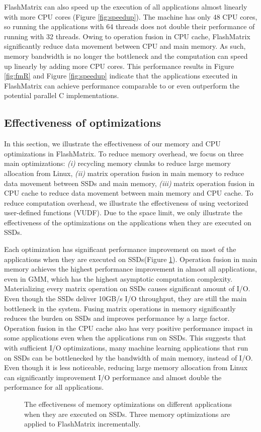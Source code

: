 FlashMatrix can also speed up the execution of all applications almost linearly
with more CPU cores (Figure \ref{fig:speedup}). The machine has only 48 CPU
cores, so running the applications with 64 threads does not double their
performance of running with 32 threads. Owing to operation fusion in CPU cache,
FlashMatrix significantly
reduce data movement between CPU and main memory. As such, memory bandwidth is
no longer the bottleneck and the computation can speed up linearly by adding
more CPU cores. This performance results in Figure \ref{fig:fmR} and Figure
\ref{fig:speedup} indicate that the applications executed in FlashMatrix can
achieve performance comparable to or even outperform the potential parallel
C implementations.

\subsection{Effectiveness of optimizations}

In this section, we illustrate the effectiveness of our memory and CPU
optimizations in FlashMatrix. To reduce memory overhead, we focus on three
main optimizations: \textit{(i)} recycling memory chunks to reduce large
memory allocation from Linux, \textit{(ii)} matrix operation fusion in main
memory to reduce data movement between SSDs and main memory, \textit{(iii)}
matrix operation fusion in CPU cache to reduce data movement between main
memory and CPU cache. To reduce computation overhead, we illustrate
the effectiveness of using vectorized user-defined functions (VUDF).
Due to the space limit, we only illustrate the effectiveness of
the optimizations on the applications when they are executed on SSDs.

Each optimization has significant performance improvement on most of the
applications when they are executed on SSDs(Figure \ref{perf:opts}).
Operation fusion in main memory achieves
the highest performance improvement in almost all applications, even in GMM,
which has the highest asymptotic computation complexity. Materializing every
matrix operation on SSDs causes significant amount of I/O. Even though the SSDs
deliver 10GB/s I/O throughput, they are still the main bottleneck in the system.
Fusing matrix operations in memory significantly reduces the burden on SSDs and
improves performance by a large factor. Operation fusion in the CPU cache also
has very positive performance impact in some applications even when
the applications run on SSDs. This suggests that with sufficient I/O optimizations,
many machine learning applications that run on SSDs can be bottlenecked by
the bandwidth of main memory, instead of I/O. Even though it is less noticeable,
reducing large memory allocation from Linux can significantly improvement I/O
performance and almost double the performance for all applications.

\begin{figure}
	\begin{center}
		\footnotesize
		
		\caption{The effectiveness of memory optimizations on different applications
			when they are executed on SSDs. Three memory optimizations are applied
		to FlashMatrix incrementally.}
		\label{perf:opts}
	\end{center}
\end{figure}
